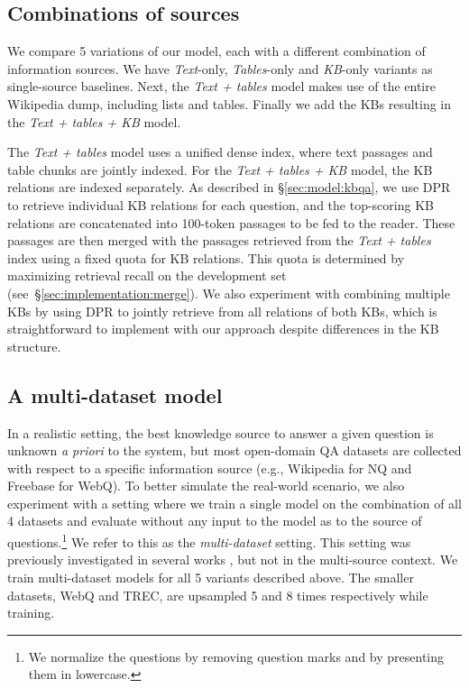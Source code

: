 \documentclass[11pt]{article}
\newcommand{\secref}[1]{\S\ref{#1}}
\begin{document}
\subsection{Combinations of sources}\label{sec:exp:combination}
We compare 5 variations of our model, each with a different combination of information sources.  We have \emph{Text}-only, \emph{Tables}-only and \emph{KB}-only variants as single-source baselines.  Next, the \emph{Text + tables} model makes use of the entire Wikipedia dump, including lists and tables.  Finally we add the KBs resulting in the \emph{Text + tables + KB} model. 

The \emph{Text + tables} model uses a unified dense index, where text passages and table chunks are jointly indexed. 
For the \emph{Text + tables + KB} model, the KB relations are indexed separately.
As described in \secref{sec:model:kbqa}, we use DPR to retrieve individual KB relations for each question, and the top-scoring KB relations are concatenated into 100-token passages to be fed to the reader.
These passages are then merged with the passages retrieved from the \emph{Text + tables} index using a fixed quota for KB relations.
This quota is determined by maximizing retrieval recall on the development set (see~\secref{sec:implementation:merge}). 
We also experiment with combining multiple KBs by using DPR to jointly retrieve from all relations of both KBs, which is straightforward to implement with our approach despite differences in the KB structure.


\subsection{A multi-dataset model}\label{sec:exp:multidataset}

In a realistic setting, the best knowledge source to answer a given question is unknown \emph{a priori} to the system, but most open-domain QA datasets are collected with respect to a specific information source (e.g., Wikipedia for NQ and Freebase for WebQ).
To better simulate the real-world scenario, we also experiment with a setting where we train a single model on the combination of all 4 datasets and evaluate without any input to the model as to the source of questions.\footnote{We normalize the questions by removing question marks and by presenting them in lowercase.}  We refer to this as the \emph{multi-dataset} setting.  This setting was previously investigated in several works \citep{DPR, maillard-etal-2021-multi, qi-etal-2021-answering}, but not in the multi-source context. We train multi-dataset models for all 5 variants described above.  The smaller datasets, WebQ and TREC, are upsampled 5 and 8 times respectively while training.
\end{document}
